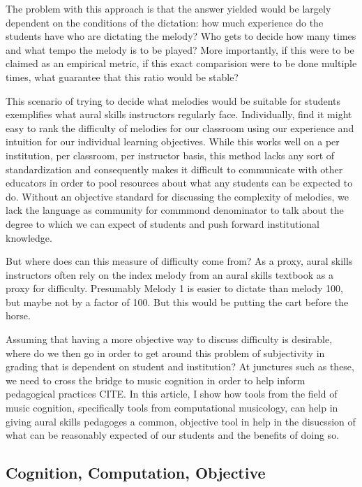 \documentclass[english,man,floatsintext]{apa6}
\begin{document}
The problem with this approach is that the answer yielded would be largely dependent on the conditions of the dictation: how much experience do the students have who are dictating the melody? Who gets to decide how many times and what tempo the melody is to be played?
More importantly, if this were to be claimed as an empirical metric, if this exact comparision were to be done multiple times, what guarantee that this ratio would be stable?

This scenario of trying to decide what melodies would be suitable for students exemplifies what aural skills instructors regularly face.
Individually, find it might easy to rank the difficulty of melodies for our classroom using our experience and intuition for our individual learning objectives.
While this works well on a per institution, per classroom, per instructor basis, this method lacks any sort of standardization and consequently makes it difficult to communicate with other educators in order to pool resources about what any students can be expected to do.
Without an objective standard for discussing the complexity of melodies, we lack the language as community for commmond denominator to talk about the degree to which we can expect of students and push forward institutional knowledge.

But where does can this measure of difficulty come from?
As a proxy, aural skills instructors often rely on the index melody from an aural skills textbook as a proxy for difficulty.
Presumably Melody 1 is easier to dictate than melody 100, but maybe not by a factor of 100.
But this would be putting the cart before the horse.

Assuming that having a more objective way to discuss difficulty is desirable, where do we then go in order to get around this problem of subjectivity in grading that is dependent on student and institution?
At junctures such as these, we need to cross the bridge to music cognition in order to help inform pedagogical practices CITE.
In this article, I show how tools from the field of music cognition, specifically tools from computational musicology, can help in giving aural skills pedagoges a common, objective tool in help in the disucssion of what can be reasonably expected of our students and the benefits of doing so.

\hypertarget{cognition-computation-objective}{%
\subsection{Cognition, Computation, Objective}\label{cognition-computation-objective}}
\end{document}
